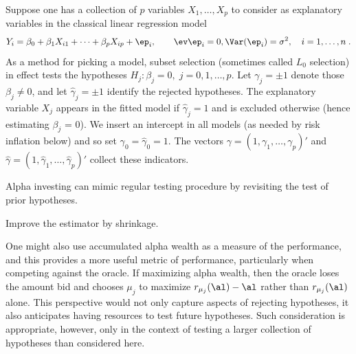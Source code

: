 \documentclass[12pt]{article}
\begin{document}
  Suppose one has a collection of $p$ variables $X_1, \ldots, X_p$ to consider as
 explanatory variables in the classical linear regression model
 \begin{equation}
   Y_i = \beta_0 + \beta_1 X_{i1} + \cdots + \beta_p X_{ip} + \ep_i, 
     \qquad \ev \ep_i = 0, \Var(\ep_i)=\sigma^2,  \quad i = 1,\ldots,n\;.
 \label{eq:regr}
 \end{equation}
 As a method for picking a model, subset selection (sometimes called $L_0$
 selection) in effect tests the hypotheses $H_j: \beta_j = 0, \; j = 0, 1, \ldots, p$.
  Let $\gamma_j = \pm 1$ denote those $\beta_j \ne 0$, and let $\hat\gamma_j =
 \pm 1$ identify the rejected hypotheses.  The explanatory variable $X_j$
 appears in the fitted model if $\hat\gamma_j = 1$ and is excluded otherwise
 (hence estimating $\beta_j$ = 0).  We insert an intercept in all models (as
 needed by risk inflation below) and so set $\gamma_0=\hat\gamma_0 = 1$.  The
 vectors $\gamma = (1, \gamma_1, \ldots, \gamma_p)'$ and $\hat\gamma = (1,
 \hat\gamma_1, \ldots, \hat\gamma_p)'$ collect these indicators.


Alpha investing can mimic regular testing procedure by revisiting the test of
prior hypotheses. 

Improve the estimator by shrinkage.



 One might also use accumulated alpha wealth as a measure of the performance, and
 this provides a more useful metric of performance, particularly when competing
 against the oracle.  If maximizing alpha wealth, then the oracle loses the
 amount bid and chooses $\mu_j$ to maximize $r_{\mu_j}(\al)-\al$ rather than
 $r_{\mu_j}(\al)$ alone.  This perspective would not only capture aspects of
 rejecting hypotheses, it also anticipates having resources to test future
 hypotheses.  Such consideration is appropriate, however, only in the context of
 testing a larger collection of hypotheses than considered here.

\end{document}
